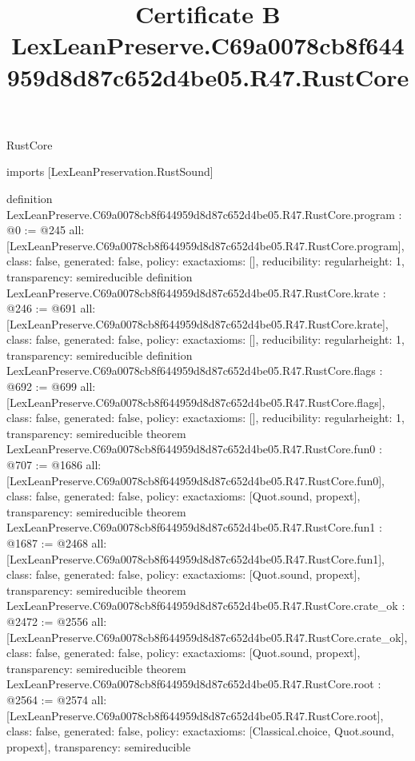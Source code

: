 \begin{lexlean}{RustCore}
\title{Certificate B LexLeanPreserve.C69a0078cb8f644959d8d87c652d4be05.R47.RustCore}
\begin{coremodule}
imports [LexLeanPreservation.RustSound]

definition LexLeanPreserve.C69a0078cb8f644959d8d87c652d4be05.R47.RustCore.program : @0 := @245 {
  all: [LexLeanPreserve.C69a0078cb8f644959d8d87c652d4be05.R47.RustCore.program],
  class: false,
  generated: false,
  policy: exact{axioms: []},
  reducibility: regular{height: 1},
  transparency: semireducible
}
definition LexLeanPreserve.C69a0078cb8f644959d8d87c652d4be05.R47.RustCore.krate : @246 := @691 {
  all: [LexLeanPreserve.C69a0078cb8f644959d8d87c652d4be05.R47.RustCore.krate],
  class: false,
  generated: false,
  policy: exact{axioms: []},
  reducibility: regular{height: 1},
  transparency: semireducible
}
definition LexLeanPreserve.C69a0078cb8f644959d8d87c652d4be05.R47.RustCore.flags : @692 := @699 {
  all: [LexLeanPreserve.C69a0078cb8f644959d8d87c652d4be05.R47.RustCore.flags],
  class: false,
  generated: false,
  policy: exact{axioms: []},
  reducibility: regular{height: 1},
  transparency: semireducible
}
theorem LexLeanPreserve.C69a0078cb8f644959d8d87c652d4be05.R47.RustCore.fun0 : @707 := @1686 {
  all: [LexLeanPreserve.C69a0078cb8f644959d8d87c652d4be05.R47.RustCore.fun0],
  class: false,
  generated: false,
  policy: exact{axioms: [Quot.sound, propext]},
  transparency: semireducible
}
theorem LexLeanPreserve.C69a0078cb8f644959d8d87c652d4be05.R47.RustCore.fun1 : @1687 := @2468 {
  all: [LexLeanPreserve.C69a0078cb8f644959d8d87c652d4be05.R47.RustCore.fun1],
  class: false,
  generated: false,
  policy: exact{axioms: [Quot.sound, propext]},
  transparency: semireducible
}
theorem LexLeanPreserve.C69a0078cb8f644959d8d87c652d4be05.R47.RustCore.crate_ok : @2472 := @2556 {
  all: [LexLeanPreserve.C69a0078cb8f644959d8d87c652d4be05.R47.RustCore.crate_ok],
  class: false,
  generated: false,
  policy: exact{axioms: [Quot.sound, propext]},
  transparency: semireducible
}
theorem LexLeanPreserve.C69a0078cb8f644959d8d87c652d4be05.R47.RustCore.root : @2564 := @2574 {
  all: [LexLeanPreserve.C69a0078cb8f644959d8d87c652d4be05.R47.RustCore.root],
  class: false,
  generated: false,
  policy: exact{axioms: [Classical.choice, Quot.sound, propext]},
  transparency: semireducible
}


\end{coremodule}
\end{lexlean}

